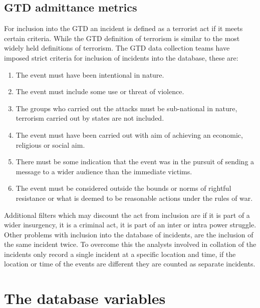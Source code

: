 \subsection{GTD admittance metrics}
For inclusion into the GTD an incident is defined as a terrorist act if it meets certain criteria. While the GTD definition of terrorism is similar to the most widely held definitions of terrorism. The GTD data collection teams have imposed strict criteria for inclusion of incidents into the database, these are:
\begin{enumerate}
\item The event must have been intentional in nature.
\item The event must include some use or threat of violence.
\item The groups who carried out the attacks must be sub-national in nature, terrorism carried out by states are not included.
\item The event must have been carried out with aim of achieving an economic, religious or social aim.
\item There must be some indication that the event was in the pursuit of sending a message to a wider audience than the immediate victims.
\item  The event must be considered outside the bounds or norms of rightful resistance or what is deemed to be reasonable actions under the rules of war.
\end{enumerate}

Additional filters which may discount the act from inclusion are if it is part of a wider insurgency, it is a criminal act, it is part of an inter or intra power struggle.
Other problems with inclusion into the database of incidents, are the inclusion of the same incident twice. To overcome this the analysts involved in collation of the incidents only record a single incident at a specific location and time, if the location or time of the events are different they are counted as separate incidents.

\section{The database variables}

